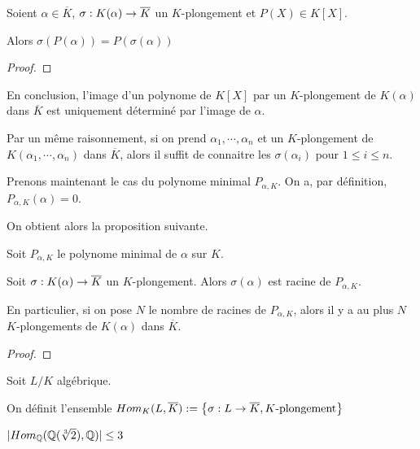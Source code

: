 \begin{proposition}
	Soient $\alpha \in \overline{K}$,
	$\sigma : K(\alpha) \rightarrow \overline{K}$ un $K$-plongement et $P(X) \in K[X]$.

	Alors $\sigma(P(\alpha)) = P(\sigma(\alpha))$
\end{proposition}

\ifdefined\outputproof
\begin{proof}

\end{proof}
\fi

En conclusion, l'image d'un polynome de $K[X]$ par un $K$-plongement de
$K(\alpha)$ dans $\overline{K}$ est uniquement déterminé par l'image de
$\alpha$.

Par un même raisonnement, si on prend $\alpha_{1}, \cdots, \alpha_{n}$ et un
$K$-plongement de $K(\alpha_{1}, \cdots, \alpha_{n})$ dans $\overline{K}$, alors
il suffit de connaitre les $\sigma(\alpha_{i})$ pour $1 \leq i \leq n$.

Prenons maintenant le cas du polynome minimal $P_{\alpha, K}$.
On a, par définition, $P_{\alpha, K}(\alpha) = 0$.

On obtient alors la proposition suivante.

\begin{proposition}
	Soit $P_{\alpha, K}$ le polynome minimal de $\alpha$ sur $K$.

	Soit $\sigma : K(\alpha) \rightarrow \overline{K}$ un $K$-plongement. Alors
	$\sigma(\alpha)$ est racine de $P_{\alpha, K}$.

	En particulier, si on pose $N$ le nombre de racines de $P_{\alpha, K}$,
	alors il y a au plus $N$ $K$-plongements de $K(\alpha)$ dans $\overline{K}$.
\end{proposition}

\ifdefined\outputproof
\begin{proof}

\end{proof}
\fi

\begin{definition}
	Soit $L/K$ algébrique.

	On définit l'ensemble $Hom_{K}(L, \overline{K}) :=
	\left\{ \sigma : L \rightarrow \overline{K}, \text{$K$-plongement} \right\}$
\end{definition}

\begin{exemple}
	$|Hom_{\mathbb{Q}}(\mathbb{Q}(\sqrt[3]{2}), \mathbb{Q})| \leq 3$
\end{exemple}

